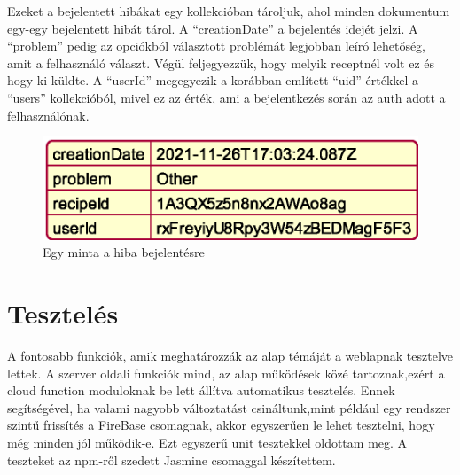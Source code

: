 \documentclass[12pt]{report}
\theoremstyle{definition}
\begin{document}
Ezeket a bejelentett hibákat egy kollekcióban tároljuk, ahol minden dokumentum egy-egy bejelentett hibát tárol. A “creationDate” a bejelentés idejét jelzi. A “problem” pedig az opciókból választott problémát legjobban leíró lehetőség, amit a felhasználó választ. Végül feljegyezzük, hogy melyik receptnél volt ez és hogy ki küldte. A “userId” megegyezik a korábban említett “uid” értékkel a “users” kollekcióból, mivel ez az érték, ami a bejelentkezés során az auth adott a felhasználónak.

\noindent
\begin{figure}[H]
	\centering
	\includegraphics[scale=0.6]{out/diagrams/jsonReports/jsonReports.eps}
	\caption{Egy minta a hiba bejelentésre}
    \label{fig:jsonReports}
\end{figure}





\chapter{Tesztelés}
A fontosabb funkciók, amik meghatározzák az alap témáját a weblapnak tesztelve lettek. A szerver oldali funkciók mind, az alap működések közé tartoznak,ezért a cloud function moduloknak be lett állítva automatikus tesztelés. Ennek segítségével, ha valami nagyobb változtatást csináltunk,mint például egy rendszer szintű frissítés a FireBase csomagnak, akkor egyszerűen le lehet tesztelni, hogy még minden jól működik-e. Ezt egyszerű unit tesztekkel oldottam meg. A teszteket az npm-ről szedett Jasmine csomaggal készítettem.
\end{document}
